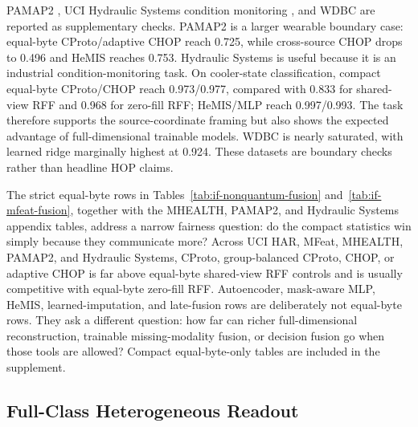 \documentclass[preprint]{elsarticle}
\begin{document}
PAMAP2 \cite{reiss2012pamap2}, UCI Hydraulic Systems condition monitoring \cite{helwig2015hydraulic}, and WDBC \cite{street1993wdbc} are reported as supplementary checks. PAMAP2 is a larger wearable boundary case: equal-byte CProto/adaptive CHOP reach 0.725, while cross-source CHOP drops to 0.496 and HeMIS reaches 0.753. Hydraulic Systems is useful because it is an industrial condition-monitoring task. On cooler-state classification, compact equal-byte CProto/CHOP reach 0.973/0.977, compared with 0.833 for shared-view RFF and 0.968 for zero-fill RFF; HeMIS/MLP reach 0.997/0.993. The task therefore supports the source-coordinate framing but also shows the expected advantage of full-dimensional trainable models. WDBC is nearly saturated, with learned ridge marginally highest at 0.924. These datasets are boundary checks rather than headline HOP claims.

The strict equal-byte rows in Tables~\ref{tab:if-nonquantum-fusion} and~\ref{tab:if-mfeat-fusion}, together with the MHEALTH, PAMAP2, and Hydraulic Systems appendix tables, address a narrow fairness question: do the compact statistics win simply because they communicate more? Across UCI HAR, MFeat, MHEALTH, PAMAP2, and Hydraulic Systems, CProto, group-balanced CProto, CHOP, or adaptive CHOP is far above equal-byte shared-view RFF controls and is usually competitive with equal-byte zero-fill RFF. Autoencoder, mask-aware MLP, HeMIS, learned-imputation, and late-fusion rows are deliberately not equal-byte rows. They ask a different question: how far can richer full-dimensional reconstruction, trainable missing-modality fusion, or decision fusion go when those tools are allowed? Compact equal-byte-only tables are included in the supplement.

\subsection{Full-Class Heterogeneous Readout}
\end{document}
